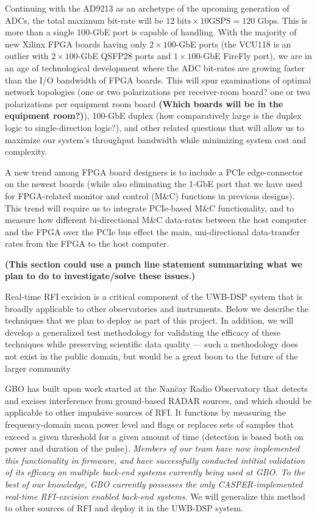 \documentclass[10pt]{myNSF}
\begin{document}
Continuing with the AD9213 as an archetype of the upcoming generation
of ADCs, the total maximum bit-rate will be $12\; \mathrm{bits} \times
10 \mathrm{GSPS} = 120\; \mathrm{Gbps}$. This is more than a single
100-GbE port is capable of handling.  With the majority of new Xilinx
FPGA boards having only $2 \times 100$-GbE ports (the VCU118 is an
outlier with $2 \times100$-GbE QSFP28 ports and $1 \times 100$-GbE
FireFly port), we are in an age of technological development where the
ADC bit-rates are growing faster than the I/O bandwidth of FPGA
boards. This will spur examinations of optimal network topologies (one
or two polarizations per receiver-room board? one or two polarizations
per equipment room board \textbf{(Which boards will be in the
  equipment room?)}), 100-GbE duplex (how comparatively large is the
duplex logic to single-direction logic?), and other related questions
that will allow us to maximize our system’s throughput bandwidth while
minimizing system cost and complexity.

A new trend among FPGA board designers is to include a PCIe
edge-connector on the newest boards (while also eliminating the 1-GbE
port that we have used for FPGA-related monitor and control (M\&C)
functions in previous designs). This trend will require us to
integrate PCIe-based M\&C functionality, and to measure how different
bi-directional M\&C data-rates between the host computer and the FPGA
over the PCIe bus effect the main, uni-directional data-transfer rates
from the FPGA to the host computer.

\textbf{(This section could use a punch line statement summarizing
  what we plan to do to investigate/solve these issues.)}

\label{sec:rfi_excision}

Real-time RFI excision is a critical component of the UWB-DSP system
that is broadly applicable to other observatories and instruments.
Below we describe the techniques that we plan to deploy as part of
this project.  In addition, we will develop a generalized test
methodology for validating the efficacy of these techniques while
preserving scientific data quality --- such a methodology does not
exist in the public domain, but would be a great boon to the future of
the larger community

 GBO has built upon
work started at the Nan\"{c}ay Radio Observatory \citep{dwr17} that
detects and excises interference from ground-based RADAR sources, and
which should be applicable to other impulsive sources of RFI.  It
functions by measuring the frequency-domain mean power level and flags
or replaces sets of samples that exceed a given threshold for a given
amount of time (detection is based both on power and duration of the
pulse).  \emph{Members of our team have now implemented this
  functionality in firmware, and have successfully conducted intitial
  validation of its efficacy on multiple back-end systems currently
  being used at GBO.  To the best of our knowledge, GBO currently
  possesses the only CASPER-implemented real-time RFI-excision enabled
  back-end systems.}  We will generalize this method to other sources
of RFI and deploy it in the UWB-DSP system.
\end{document}
